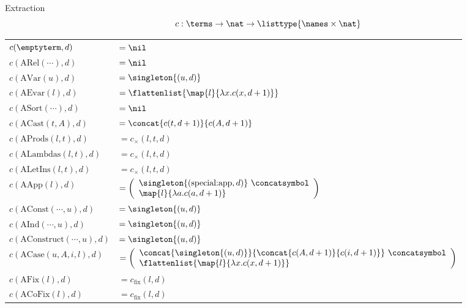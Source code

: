 \begin{frame}{Extraction}
	\vspace{-2.55em}
	\[c : \terms \rightarrow \nat \rightarrow \listtype{\names \times \nat} \]
	\bigskip
	\hspace{-1.7em}
	\begin{tabularx}{\textwidth}{ll}
		$c(\emptyterm, d)$              & $ = \nil $ \\
		$c(\text{ARel}(\cdots), d)$     & $ = \nil $ \\
		$c(\text{AVar}(u), d)$          & $ = \singleton{(u, d)} $ \\
		$c(\text{AEvar}(l), d)$         & $ = \flattenlist{\map{l}{\lambda x . c(x, d+1)}} $ \\
		$c(\text{ASort}(\cdots), d)$    & $ = \nil $ \\
		$c(\text{ACast}(t, A), d)$      & $ = \concat{c(t, d+1)}{c(A, d+1)} $ \\
		$c(\text{AProds}(l, t), d)$     & $ = c_{\times}(l, t, d) $ \\
		$c(\text{ALambdas}(l, t), d)$   & $ = c_{\times}(l, t, d) $ \\
		$c(\text{ALetIns}(l, t), d)$    & $ = c_{\times}(l, t, d) $ \\
		$c(\text{AApp}(l), d)$  & $ = \left(
		  \begin{array}{l}
			\singleton{(\text{special:app}, d)} ~\concatsymbol \\
			\map{l}{ \lambda a . c(a, d+1) }
		  \end{array}
		  \right)
		  $ \\
		$c(\text{AConst}(\cdots, u), d)$  & $ = \singleton{(u, d)} $ \\
		$c(\text{AInd}(\cdots, u), d)$  & $ = \singleton{(u, d)} $ \\
		$c(\text{AConstruct}(\cdots, u), d)$  & $ = \singleton{(u, d)} $ \\
		$c(\text{ACase}(u, A, i, l), d)$  &
		  $= \left(
			\begin{array}{l}
			  \concat{\singleton{(u, d)}}{
				\concat{c(A, d+1)}{c(i, d+1)}
			  }
			  ~\concatsymbol \\
			  \flattenlist{ \map{l}{\lambda x . c(x, d+1)} } \\
			\end{array}
			\right)
		  $ \\
		$c(\text{AFix}(l), d)$        & $ = c_{\text{fix}}(l, d) $ \\
		$c(\text{ACoFix}(l), d)$      & $ = c_{\text{fix}}(l, d) $ \\
	\end{tabularx}
\end{frame}

